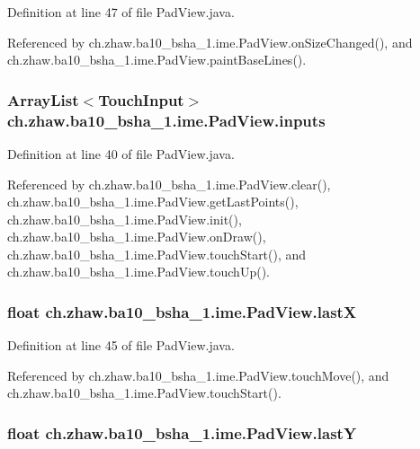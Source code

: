 Definition at line 47 of file PadView.java.

Referenced by ch.zhaw.ba10\_\-bsha\_\-1.ime.PadView.onSizeChanged(), and ch.zhaw.ba10\_\-bsha\_\-1.ime.PadView.paintBaseLines().\hypertarget{classch_1_1zhaw_1_1ba10__bsha__1_1_1ime_1_1PadView_a73761fbcb4c8d5848fa88f6293d12519}{
\subsubsection[{inputs}]{\setlength{\rightskip}{0pt plus 5cm}ArrayList$<${\bf TouchInput}$>$ {\bf ch.zhaw.ba10\_\-bsha\_\-1.ime.PadView.inputs}}}
\label{classch_1_1zhaw_1_1ba10__bsha__1_1_1ime_1_1PadView_a73761fbcb4c8d5848fa88f6293d12519}


Definition at line 40 of file PadView.java.

Referenced by ch.zhaw.ba10\_\-bsha\_\-1.ime.PadView.clear(), ch.zhaw.ba10\_\-bsha\_\-1.ime.PadView.getLastPoints(), ch.zhaw.ba10\_\-bsha\_\-1.ime.PadView.init(), ch.zhaw.ba10\_\-bsha\_\-1.ime.PadView.onDraw(), ch.zhaw.ba10\_\-bsha\_\-1.ime.PadView.touchStart(), and ch.zhaw.ba10\_\-bsha\_\-1.ime.PadView.touchUp().\hypertarget{classch_1_1zhaw_1_1ba10__bsha__1_1_1ime_1_1PadView_ab132a8e8a4f00924500f87483cff2a98}{
\subsubsection[{lastX}]{\setlength{\rightskip}{0pt plus 5cm}float {\bf ch.zhaw.ba10\_\-bsha\_\-1.ime.PadView.lastX}}}
\label{classch_1_1zhaw_1_1ba10__bsha__1_1_1ime_1_1PadView_ab132a8e8a4f00924500f87483cff2a98}


Definition at line 45 of file PadView.java.

Referenced by ch.zhaw.ba10\_\-bsha\_\-1.ime.PadView.touchMove(), and ch.zhaw.ba10\_\-bsha\_\-1.ime.PadView.touchStart().\hypertarget{classch_1_1zhaw_1_1ba10__bsha__1_1_1ime_1_1PadView_a2e3aa9d507464cf235778e66baea84a0}{
\subsubsection[{lastY}]{\setlength{\rightskip}{0pt plus 5cm}float {\bf ch.zhaw.ba10\_\-bsha\_\-1.ime.PadView.lastY}}}
\label{classch_1_1zhaw_1_1ba10__bsha__1_1_1ime_1_1PadView_a2e3aa9d507464cf235778e66baea84a0}


